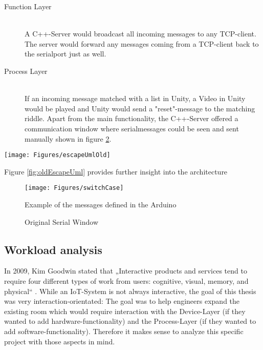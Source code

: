 \begin{description}
	\item[Function Layer]\hfill \\
        A C++-Server would broadcast all incoming messages to any TCP-client.    
        The server would forward any messages coming from a TCP-client back to the serialport just as well.
	\item[Process Layer]\hfill \\
	If an incoming message matched with a list in Unity, a Video in Unity would be played and Unity would send a "reset"-message to the matching riddle. 
	Apart from the main functionality, the C++-Server offered a communication window where serialmessages 
    could be seen and sent manually shown in figure \ref{fig:c++window}.

\end{description}

    \begin{sidewaysfigure}
        \centering
        \texttt{[image: Figures/escapeUmlOld]}
        \caption{The old escape room architecture}
        \label{fig:oldEscapeUml}
    \end{sidewaysfigure}

Figure \ref{fig:oldEscapeUml} provides further insight into the architecture

\begin{figure}[th]
    \centering
    \texttt{[image: Figures/switchCase]}
    \decoRule
    \caption[messages]{Example of the messages defined in the Arduino}
    \label{fig:switchCase}
\end{figure}

\begin{figure}[th]
    \decoRule
    \caption[messages]{Original Serial Window}
    \label{fig:c++window}
\end{figure}

\subsection{Workload analysis}
In 2009, Kim Goodwin stated that 
„Interactive products and services tend to require four different types of work from users: 
cognitive, visual, memory, and physical“ \parencite{designDigitalAge}. 
While an IoT-System is not always interactive, the goal of this thesis was very interaction-orientated: 
The goal was to help engineers expand the existing room which would require 
interaction with the Device-Layer (if they wanted to add hardware-functionality) 
and the Process-Layer (if they wanted to add software-functionality).
Therefore it makes sense to analyze this specific project with those aspects in mind. 

